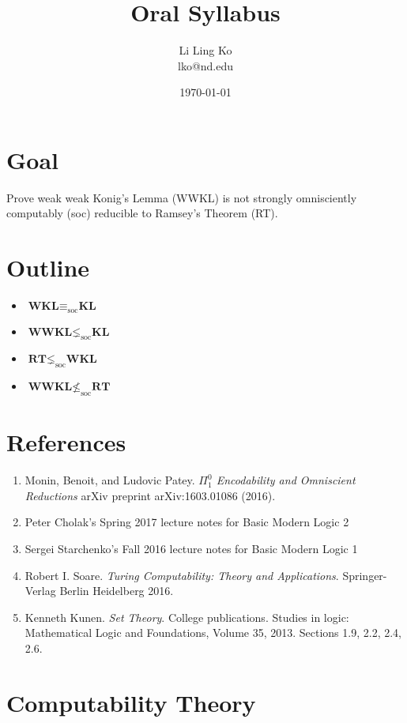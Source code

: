 \documentclass{article}
\begin{document}
\title{Oral Syllabus}
\author{Li Ling Ko\\ lko@nd.edu}
\date{\today}
\maketitle

\section{Goal}
Prove weak weak Konig's Lemma (WWKL) is not strongly omnisciently computably
(soc) reducible to Ramsey's Theorem (RT).

\section{Outline}
\begin{itemize}
  \item $\textbf{WKL} \equiv_{\text{soc}} \textbf{KL}$
  \item $\textbf{WWKL} \lneq_{\text{soc}} \textbf{KL}$
  \item $\textbf{RT} \lneq_{\text{soc}} \textbf{WKL}$
  \item $\textbf{WWKL} \nleq_{\text{soc}} \textbf{RT}$
\end{itemize}

\section{References}
\begin{enumerate}
  \item Monin, Benoit, and Ludovic Patey. \textit{$\Pi_1^0$ Encodability and
    Omniscient Reductions} arXiv preprint arXiv:1603.01086 (2016).
  \item Peter Cholak's Spring 2017 lecture notes for Basic Modern Logic 2
  \item Sergei Starchenko's Fall 2016 lecture notes for Basic Modern Logic
    1
  \item Robert I. Soare. \textit{Turing Computability: Theory and
    Applications}. Springer-Verlag Berlin Heidelberg 2016.
  \item Kenneth Kunen. \textit{Set Theory}. College publications. Studies
    in logic: Mathematical Logic and Foundations, Volume 35, 2013. Sections
    1.9, 2.2, 2.4, 2.6.
\end{enumerate}

\section{Computability Theory}
\end{document}
